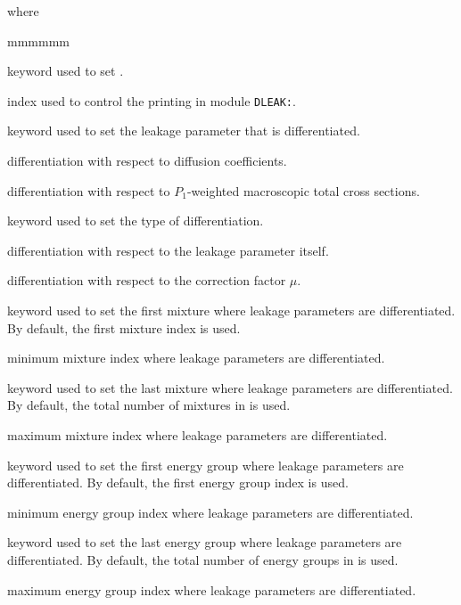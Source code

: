 \noindent where
\begin{ListeDeDescription}{mmmmmm}

\item[\moc{EDIT}] keyword used to set .

\item[\dusa{iprint}] index used to control the printing in module {\tt DLEAK:}.

\item[\moc{TYPE}] keyword used to set the leakage parameter that is differentiated.

\item[\moc{DIFF}] differentiation with respect to diffusion coefficients.

\item[\moc{NTOT1}] differentiation with respect to $P_1$-weighted macroscopic total cross sections.

\item[\moc{DELTA}] keyword used to set the type of differentiation.

\item[\moc{VALUE}] differentiation with respect to the leakage parameter itself.

\item[\moc{FACTOR}] differentiation with respect to the correction factor $\mu$.

\item[\moc{MIXMIN}] keyword used to set the first mixture where leakage parameters are differentiated. By default,
the first mixture index is used.

\item[\dusa{ibm1}] minimum mixture index where leakage parameters are differentiated.

\item[\moc{MIXMAX}] keyword used to set the last mixture where leakage parameters are differentiated. By default,
the total number of mixtures in  is used.

\item[\dusa{ibm2}] maximum mixture index where leakage parameters are differentiated.

\item[\moc{GRPMIN}] keyword used to set the first energy group where leakage parameters are differentiated. By default,
the first energy group index is used.

\item[\dusa{ngr1}] minimum energy group index where leakage parameters are differentiated.

\item[\moc{GRPMAX}] keyword used to set the last energy group where leakage parameters are differentiated. By default,
the total number of energy groups in  is used.

\item[\dusa{ngr2}] maximum energy group index where leakage parameters are differentiated.

\end{ListeDeDescription}
\clearpage
